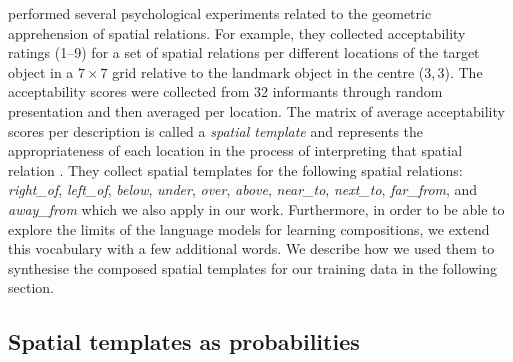 \cite{logan1996computational} performed several psychological experiments related to the geometric apprehension of
spatial relations. For example, %
they collected
acceptability ratings (1--9) for a set of spatial relations per different
locations of the target object in a $7 \times 7$ grid relative to the landmark object in the centre ($3,3$). The acceptability scores were
collected from 32 informants through random presentation and then averaged per location. The matrix of average acceptability scores per description is called a \textit{spatial template} and represents the appropriateness
of each location in the process of interpreting that spatial relation
\cite{logan1996computational}.
They collect spatial templates for the following spatial relations:
\textit{right\_of}, \textit{left\_of},
\textit{below}, \textit{under}, \textit{over}, \textit{above},
\textit{near\_to}, \textit{next\_to}, \textit{far\_from}, and \textit{away\_from} which we also apply in our work. Furthermore, in order to be able to explore the limits of the language models for learning
compositions, we extend this vocabulary with a few additional words.
We describe how we used them to synthesise the composed spatial templates for our training data in the following section.

\subsection{Spatial templates as probabilities}

